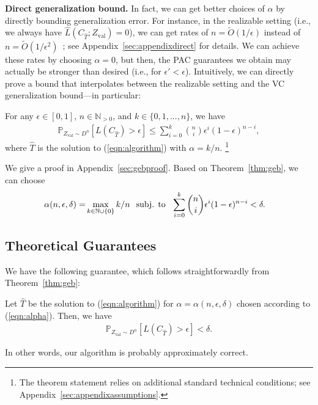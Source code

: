 \documentclass{article} \usepackage{iclr2020_conference,times}
\renewcommand{\(}						{\left(}
\renewcommand{\)}						{\right)}
\renewcommand{\[}						{\left[}
\renewcommand{\]}						{\right]}
\newcommand{\<}						{\left<}
\renewcommand{\>}						{\right>}
\begin{document}
\textbf{Direct generalization bound.}
In fact, we can get better choices of $\alpha$ by directly bounding generalization error. For instance, in the realizable setting (i.e., we always have $\hat{L}(C_{\hat{T}};Z_{\text{val}})=0$), we can get rates of $n=\tilde O(1/\epsilon)$ instead of $n=\tilde O(1/\epsilon^2)$~\citep{kearns1994introduction}; see Appendix~\ref{sec:appendixdirect} for details. We can achieve these rates by choosing $\alpha=0$, but then, the PAC guarantees we obtain may actually be stronger than desired (i.e., for $\epsilon'<\epsilon$). Intuitively, we can directly prove a bound that interpolates between the realizable setting and the VC generalization bound---in particular:
\begin{theorem}
\label{thm:geb}
For any $\epsilon\in[0,1]$, $n\in\mathbb{N}_{>0}$, and $k\in\{0,1,...,n\}$, we have
\begin{align*}
\mathbb{P}_{Z_{\text{val}}\sim D^n}\left[ L(C_{\hat{T}}) > \epsilon \right] \le \sum_{i=0}^k {n \choose i} \epsilon^{i} (1 - \epsilon)^{n-i},
\end{align*}
where $\hat{T}$ is the solution to (\ref{eqn:algorithm}) with $\alpha=k/n$.
\footnote{The theorem statement relies on additional standard technical conditions; see Appendix~\ref{sec:appendixassumptions}.}
\end{theorem}
We give a proof in Appendix~\ref{sec:gebproof}. Based on Theorem~\ref{thm:geb}, we can choose
\begin{align}
\label{eqn:alpha}
\alpha(n,\epsilon,\delta)=&\max_{k\in\mathbb{N} \cup \{0\}}k/n
\hspace{0.1in}
\text{subj. to}\hspace{0.1in}\sum_{i=0}^k {n \choose i} \epsilon^{i} (1 - \epsilon)^{n-i} < \delta.
\end{align}



\subsection{Theoretical Guarantees}

We have the following guarantee, which follows straightforwardly from Theorem~\ref{thm:geb}: 
\begin{corollary}
Let $\hat{T}$ be the solution to (\ref{eqn:algorithm}) for $\alpha=\alpha(n,\epsilon,\delta)$ chosen according to (\ref{eqn:alpha}). Then, we have
\begin{align*}
\mathbb{P}_{Z_{\text{val}}\sim D^n}\left[ L(C_{\hat{T}}) > \epsilon \right]<\delta.
\end{align*}
\end{corollary}
In other words, our algorithm is probably approximately correct.
\end{document}
